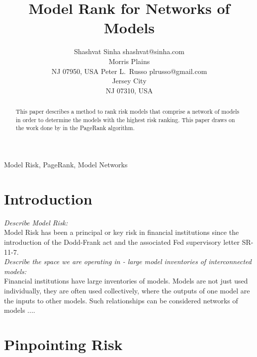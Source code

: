 \documentclass[twoside,11pt]{article}
\begin{document}
\title{Model Rank for Networks of Models}

\author{\name Shashvat Sinha \email shashvat@sinha.com \\
       \addr Morris Plains\\
       NJ 07950, USA
       \AND
       \name Peter L.\ Russo \email plrusso@gmail.com \\
       \addr Jersey City\\
       NJ 07310, USA}


\maketitle

\begin{abstract}%
This paper describes a method to rank risk models that comprise a network of models in order to determine the models with the highest risk ranking. This paper draws on the work done by \citet{brin_page} in the PageRank algorithm. 
\end{abstract}

\begin{keywords}
  Model Risk, PageRank, Model Networks
\end{keywords}

\section{Introduction}

{\noindent \em Describe Model Risk:}\\
Model Risk has been a principal or key risk in financial institutions since the introduction of the Dodd-Frank act and the associated Fed supervisory letter SR-11-7.\\

{\noindent \em Describe the space we are operating in - large model inventories of interconnected models:}\\
Financial institutions have large inventories of models. Models are not just used individually, they are often used collectively, where the outputs of one model are the inputs to other models. Such relationships can be considered networks of models ....\\


\section{Pinpointing Risk}
\end{document}
